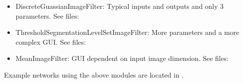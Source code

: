 \begin{itemize}
\item DiscreteGuassianImageFilter: Typical inputs and outputs and only
  3 parameters.  See files:
  \begin{alltt}
  \end{alltt}
\item ThresholdSegmentationLevelSetImageFilter: More parameters and a
  more complex GUI.  See files:
  \begin{alltt}
  \end{alltt}
\item MeanImageFilter: GUI dependent on input image dimension.  See
  files:
  \begin{alltt}
  \end{alltt}
\end{itemize}

Example networks using the above modules are located in
.

